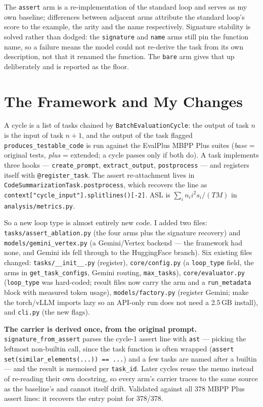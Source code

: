 \documentclass[10pt]{article}
\newcommand{\code}[1]{\texttt{\small #1}}
\begin{document}
The \code{assert} arm is a re-implementation of the standard loop and serves as
my own baseline; differences between adjacent arms attribute the standard
loop's score to the example, the arity and the name respectively. Signature
stability is solved rather than dodged: the \code{signature} and \code{name}
arms still pin the function name, so a failure means the model could not
re-derive the task from its own description, not that it renamed the function.
The \code{bare} arm gives that up deliberately and is reported as the floor.

\section{The Framework and My Changes}

A cycle is a list of tasks chained by \code{BatchEvaluationCycle}: the output of
task $n$ is the input of task $n{+}1$, and the output of the task flagged
\code{produces\_testable\_code} is run against the EvalPlus MBPP Plus suites
(\emph{base} = original tests, \emph{plus} = extended; a cycle passes only if
both do). A task implements three hooks --- \code{create\_prompt},
\code{extract\_output}, \code{postprocess} --- and registers itself with
\code{@register\_task}. The assert re-attachment lives in
\code{CodeSummarizationTask.postprocess}, which recovers the line as
\code{context["cycle\_input"].splitlines()[-2]}. ASL is
$\sum_i n_i i^2 s_i / (TM)$ in \code{analysis/metrics.py}.

So a new loop type is almost entirely new code. I added two files:
\code{tasks/assert\_ablation.py} (the four arms plus the signature recovery) and
\code{models/gemini\_vertex.py} (a Gemini/Vertex backend --- the framework had
none, and Gemini ids fell through to the HuggingFace branch). Six existing
files changed: \code{tasks/\_\_init\_\_.py} (register), \code{core/config.py}
(a \code{loop\_type} field, the arms in \code{get\_task\_configs}, Gemini
routing, \code{max\_tasks}), \code{core/evaluator.py} (\code{loop\_type} was
hard-coded; result files now carry the arm and a \code{run\_metadata} block
with measured token usage), \code{models/factory.py} (register Gemini; make the
torch/vLLM imports lazy so an API-only run does not need a 2.5\,GB install),
and \code{cli.py} (the new flags).

\textbf{The carrier is derived once, from the original prompt.}
\code{signature\_from\_assert} parses the cycle-1 assert line with
\code{ast} --- picking the leftmost non-builtin call, since the task function is
often wrapped (\code{assert set(similar\_elements(...)) == ...}) and a few tasks
are named after a builtin --- and the result is memoised per \code{task\_id}.
Later cycles reuse the memo instead of re-reading their own docstring, so every
arm's carrier traces to the same source as the baseline's and cannot itself
drift. Validated against all 378 MBPP Plus assert lines: it recovers the entry
point for 378/378.
\end{document}
